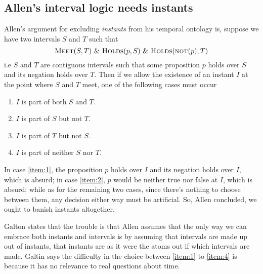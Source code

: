 \subsection{Allen's interval logic needs instants}
Allen's argument for excluding \textit{instants} from his temporal ontology is, suppose we have two intervals $S$ and $T$ such that
\[
	\textsc{Meet}(S, T) \  \& \  \textsc{Holds}(p, S) \ \&  \ \textsc{Holds}(\textsc{not}(p), T)
\]
i.e $S$ and $T$ are contiguous intervals such that some proposition $p$ holds over $S$ and its negation holds over $T$. Then if we allow the existence of an instant $I$ at the point where $S$ and $T$ meet, one of the following cases must occur
\begin{enumerate}
	\item  $I$ is part of both $S$ and $T$.\label{item:1}
	\item  $I$ is part of $S$ but not $T$.\label{item:2}
	\item  $I$ is part of $T$ but not $S$. \label{item:3}
	\item  $I$ is part of neither $S$ nor $T$. \label{item:4}
\end{enumerate}
In case \ref{item:1}, the proposition $p$ holds over $I$ and its negation holds over $I$, which is absurd;
in case \ref{item:2}, $p$ would be neither true nor false at $I$, which is absurd;
while as for the remaining two cases, since there's nothing to choose between them, any decision either way must be artificial. So, Allen concluded, we ought to banish instants altogether.

Galton states that the trouble is that Allen assumes that the only way we can embrace both instants and
intervals is by assuming that intervals are made up out of instants, that instants are as it were the atoms out if which intervals are made.
Galtin says the difficulty in the choice between \ref{item:1} to \ref{item:4} is because it has no relevance to real questions about time.

%
%
%
%

